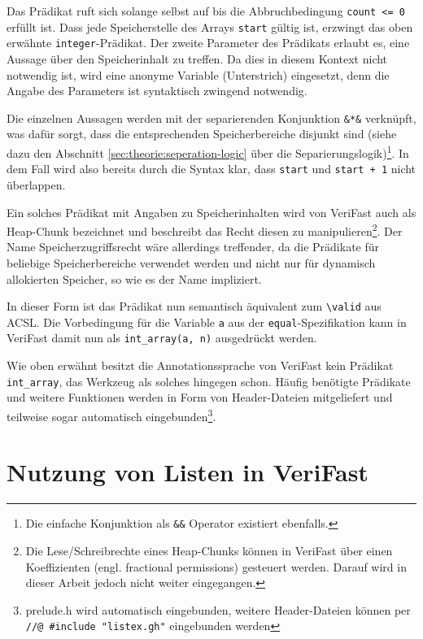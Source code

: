 Das Prädikat ruft sich solange selbst auf bis die Abbruchbedingung \lstinline{count <= 0} erfüllt ist. Dass jede Speicherstelle des Arrays \lstinline{start}
gültig ist, erzwingt das oben erwähnte \lstinline{integer}-Prädikat. Der zweite Parameter des Prädikats erlaubt es, eine
Aussage über den Speicherinhalt zu treffen. Da dies in diesem Kontext nicht notwendig ist, wird eine anonyme Variable
(Unterstrich) eingesetzt, denn die Angabe des Parameters ist syntaktisch zwingend notwendig.

Die einzelnen Aussagen werden mit der separierenden Konjunktion \lstinline{&*&} verknüpft, was dafür sorgt, dass die entsprechenden
Speicherbereiche disjunkt sind (siehe dazu den Abschnitt \ref{sec:theorie:seperation-logic} über die Separierungslogik)\footnote{Die einfache
Konjunktion als \lstinline{&&} Operator existiert ebenfalls.}. In dem Fall wird also bereits durch die Syntax klar, dass 
\lstinline{start} und \lstinline{start + 1} nicht überlappen. 

Ein solches Prädikat mit Angaben zu Speicherinhalten wird von VeriFast auch als Heap-Chunk bezeichnet und beschreibt das
Recht diesen zu manipulieren\footnote{Die Lese/Schreibrechte eines Heap-Chunks können in VeriFast über einen Koeffizienten
(engl. fractional permissions) gesteuert werden. Darauf wird in dieser Arbeit jedoch nicht weiter eingegangen.}. Der Name
Speicherzugriffsrecht wäre allerdings treffender, da die Prädikate für beliebige Speicherbereiche verwendet werden und nicht
nur für dynamisch allokierten Speicher, so wie es der Name impliziert.

In dieser Form ist das Prädikat nun semantisch äquivalent zum \lstinline{\valid} aus ACSL. Die Vorbedingung für die
Variable \lstinline{a} aus der \texttt{equal}-Spezifikation kann in VeriFast damit nun als \lstinline{int_array(a, n)}
ausgedrückt werden.

Wie oben erwähnt besitzt die Annotationssprache von VeriFast kein Prädikat \lstinline{int_array}, das Werkzeug
als solches hingegen schon. Häufig benötigte Prädikate und weitere Funktionen werden in Form von Header-Dateien
mitgeliefert und teilweise sogar automatisch eingebunden\footnote{prelude.h wird automatisch eingebunden, weitere 
Header-Dateien können per \\ \lstinline{//@ #include "listex.gh"} eingebunden werden}.


\section{Nutzung von Listen in VeriFast}
\label{sec:induktive-listen}

